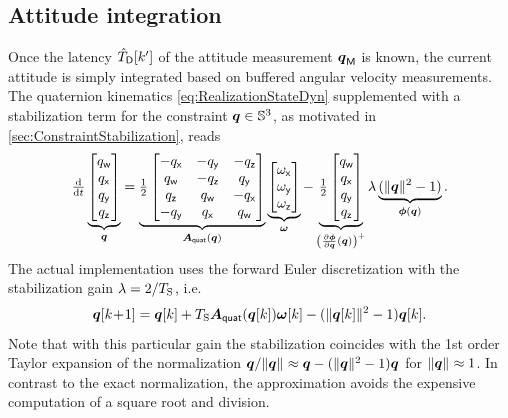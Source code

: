 \subsection{Attitude integration}
Once the latency $\TVICDObs[k']$ of the attitude measurement $\qVIC$ is known, the current attitude is simply integrated based on buffered angular velocity measurements.
The quaternion kinematics \eqref{eq:RealizationStateDyn} supplemented with a stabilization term for the constraint $\quat \in \Sphere^3$, as motivated in \autoref{sec:ConstraintStabilization}, reads
\begin{align}\label{eq:QuaternionKinematics}
 \tdiff{t} \underbrace{\begin{bmatrix} \quatw \\ \quatx \\ \quaty \\ \quatz \end{bmatrix}}_{\quat}
 = \underbrace{\tfrac{1}{2} \begin{bmatrix} -\quatx & -\quaty & -\quatz \\ \quatw & -\quatz & \quaty \\ \quatz & \quatw & -\quatx \\ -\quaty & \quatx & \quatw \end{bmatrix}}_{\kinMatQuat(\quat)}
 \underbrace{\begin{bmatrix} \wx \\ \wy \\ \wz \end{bmatrix}}_{\w}
 -
 \underbrace{\tfrac{1}{2} \begin{bmatrix} \quatw \\ \quatx \\ \quaty \\ \quatz \end{bmatrix}}_{\left(\pdiff[\geoConstraint]{\quat}(\quat)\right)^+}
 \lambda\underbrace{(\norm{\quat}^2 - 1)}_{\geoConstraint(\quat)}
 .
\end{align}
The actual implementation uses the forward Euler discretization with the stabilization gain $\lambda=\sfrac{2}{\Ts}$, i.e.\
\begin{align}\label{eq:QuaternionKinematicsDiscrete}
 \quat[k\!+\!1] = \quat[k] + \Ts \kinMatQuat(\quat[k]) \w[k] - (\norm{\quat[k]}^2-1) \quat[k].
\end{align}
Note that with this particular gain the stabilization coincides with the 1st order Taylor expansion of the normalization $\sfrac{\quat}{\norm{\quat}} \approx \quat - (\norm{\quat}^2-1) \quat$ for $\norm{\quat} \approx 1$.
In contrast to the exact normalization, the approximation avoids the expensive computation of a square root and division.

